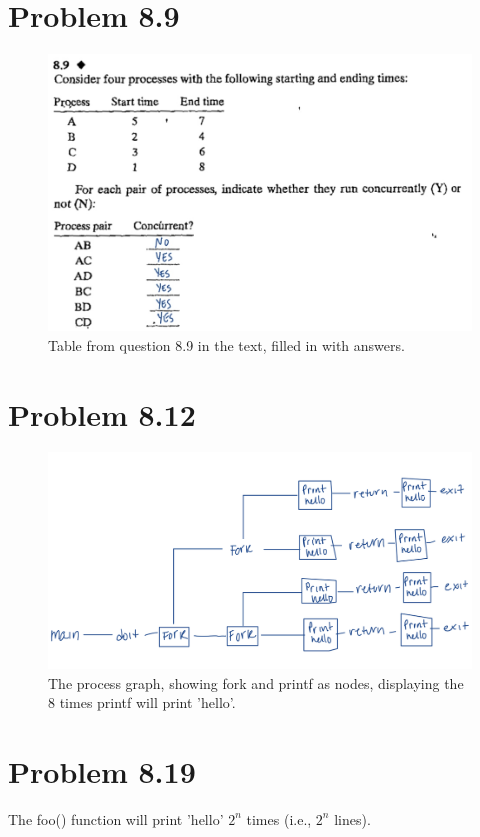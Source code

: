 \documentclass[12pt,letterpaper]{article}
\begin{document}
\section*{Problem 8.9}

\begin{figure}[!h]
    \centering
    \includegraphics[width=1\linewidth]{89.jpg}
    \caption{Table from question 8.9 in the text, filled in with answers.}
    \end{figure}
 \newpage
 
\section*{Problem 8.12}

\begin{figure}[!h]
    \centering
    \includegraphics[width=1.1\linewidth]{812.jpg}
    \caption{The process graph, showing fork and printf as nodes, displaying the 8 times printf will print 'hello'.}
    \end{figure}


\section*{Problem 8.19}

The foo() function will print 'hello' $2^{n}$ times (i.e., $2^{n}$ lines).
\end{document}
